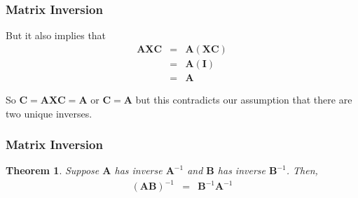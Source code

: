 \documentclass{beamer}
\newtheorem{thm}{Theorem}
\numberwithin{equation}{section}
\begin{document}
\begin{frame}
\frametitle{Matrix Inversion}

But it also implies that 
\begin{eqnarray}
\boldsymbol{AXC}  &  = & \boldsymbol{A}(\boldsymbol{X} \boldsymbol{C} ) \nonumber \\
							&  = & \boldsymbol{A} (\boldsymbol{I} ) \nonumber \\
							& = & \boldsymbol{A} \nonumber
\end{eqnarray}							

So $\boldsymbol{C} = \boldsymbol{AXC}  = \boldsymbol{A}$ or $\boldsymbol{C} =\boldsymbol{A}$ but this contradicts our assumption that there are two unique inverses.   


\end{frame}

\begin{frame}
\frametitle{Matrix Inversion}

\begin{thm} Suppose $\boldsymbol{A}$ has inverse $\boldsymbol{A}^{-1}$ and $\boldsymbol{B}$ has inverse $\boldsymbol{B}^{-1}$.  Then, 
\begin{eqnarray}
(\boldsymbol{A} \boldsymbol{B})^{-1} & = & \boldsymbol{B}^{-1} \boldsymbol{A}^{-1} \nonumber 
\end{eqnarray}
\end{thm}

\pause 



\end{frame}
\end{document}
